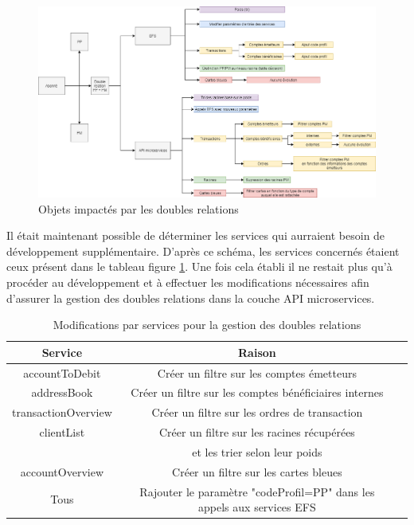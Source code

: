 \begin{figure}[h!]
	\includegraphics[scale=0.45]{images/travailNeuflizeOBC/doubleRelation/doubleRelation.png}
	\centering
	\caption{Objets impactés par les doubles relations}
	\label{doubleRelation}
\end{figure}

	Il était maintenant possible de déterminer les services qui aurraient besoin de développement supplémentaire. D'après ce schéma, les services concernés étaient ceux présent dans le tableau figure \ref{servicesDoubleRelation}. Une fois cela établi il ne restait plus qu'à procéder au développement et à effectuer les modifications nécessaires afin d'assurer la gestion des doubles relations dans la couche API microservices. \\ 
	
\begin{table}[h!]
	\center
	\begin{tabular}{| c | c | c |}
     \hline
     Service & Raison \\ \hline
     accountToDebit & Créer un filtre sur les comptes émetteurs \\ \hline
     addressBook & Créer un filtre sur les comptes bénéficiaires internes \\ \hline
     transactionOverview & Créer un filtre sur les ordres de transaction\\ \hline
     clientList & Créer un filtre sur les racines récupérées \\ & et les trier selon leur poids\\ \hline
     accountOverview & Créer un filtre sur les cartes bleues \\
     Tous & Rajouter le paramètre "codeProfil=PP" dans les appels aux services EFS \\ 
     \hline
	\end{tabular}
	\caption{Modifications par services pour la gestion des doubles relations}
	\label{servicesDoubleRelation}
\end{table}

